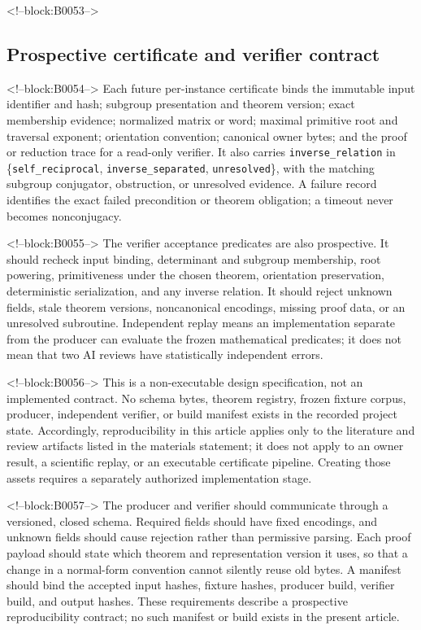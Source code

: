 \documentclass[11pt]{article}
\begin{document}
<!--block:B0053-->
\hypertarget{42-prospective-certificate-and-verifier-contract}{%
\subsection{Prospective certificate and verifier
contract}\label{42-prospective-certificate-and-verifier-contract}}

<!--block:B0054-->
Each future per-instance certificate binds the immutable input identifier and
hash; subgroup presentation and theorem version; exact membership evidence;
normalized matrix or word; maximal primitive root and traversal exponent;
orientation convention; canonical owner bytes; and the proof or reduction trace
for a read-only verifier.  It also carries
\texttt{inverse\_relation} in
\{\texttt{self\_reciprocal}, \texttt{inverse\_separated},
\texttt{unresolved}\}, with the matching subgroup conjugator, obstruction, or
unresolved evidence.  A failure record identifies the exact failed precondition
or theorem obligation; a timeout never becomes nonconjugacy.

<!--block:B0055-->
The verifier acceptance predicates are also prospective. It should
recheck input binding, determinant and subgroup membership, root
powering, primitiveness under the chosen theorem, orientation
preservation, deterministic serialization, and any inverse relation. It
should reject unknown fields, stale theorem versions, noncanonical
encodings, missing proof data, or an unresolved subroutine. Independent
replay means an implementation separate from the producer can evaluate
the frozen mathematical predicates; it does not mean that two AI reviews
have statistically independent errors.

<!--block:B0056-->
This is a non-executable design specification, not an implemented contract.
No schema bytes, theorem registry, frozen fixture corpus, producer, independent
verifier, or build manifest exists in the recorded project state. Accordingly,
reproducibility in this article applies only to the literature and review
artifacts listed in the materials statement; it does not apply to an owner
result, a scientific replay, or an executable certificate pipeline. Creating
those assets requires a separately authorized implementation stage.

<!--block:B0057-->
The producer and verifier should communicate through a versioned,
closed schema. Required fields should have fixed encodings, and unknown
fields should cause rejection rather than permissive parsing. Each proof
payload should state which theorem and representation version it uses,
so that a change in a normal-form convention cannot silently reuse old
bytes. A manifest should bind the accepted input hashes, fixture hashes,
producer build, verifier build, and output hashes. These requirements
describe a prospective reproducibility contract; no such manifest or
build exists in the present article.
\end{document}
